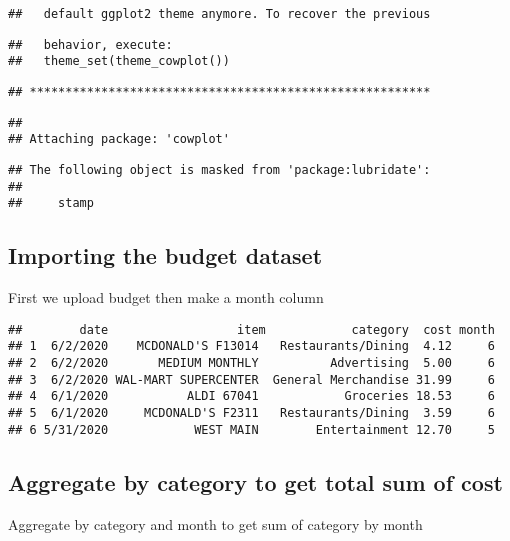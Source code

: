 \documentclass[
]{article}
\newenvironment{Shaded}{\begin{snugshade}}{\end{snugshade}}
\newcommand{\DataTypeTok}[1]{\textcolor[rgb]{0.13,0.29,0.53}{#1}}
\newcommand{\DecValTok}[1]{\textcolor[rgb]{0.00,0.00,0.81}{#1}}
\newcommand{\KeywordTok}[1]{\textcolor[rgb]{0.13,0.29,0.53}{\textbf{#1}}}
\newcommand{\NormalTok}[1]{#1}
\newcommand{\OperatorTok}[1]{\textcolor[rgb]{0.81,0.36,0.00}{\textbf{#1}}}
\newcommand{\StringTok}[1]{\textcolor[rgb]{0.31,0.60,0.02}{#1}}
\begin{document}
\begin{verbatim}
##   default ggplot2 theme anymore. To recover the previous
\end{verbatim}

\begin{verbatim}
##   behavior, execute:
##   theme_set(theme_cowplot())
\end{verbatim}

\begin{verbatim}
## ********************************************************
\end{verbatim}

\begin{verbatim}
## 
## Attaching package: 'cowplot'
\end{verbatim}

\begin{verbatim}
## The following object is masked from 'package:lubridate':
## 
##     stamp
\end{verbatim}

\hypertarget{importing-the-budget-dataset}{%
\subsection{Importing the budget
dataset}\label{importing-the-budget-dataset}}

First we upload budget then make a month column

\begin{verbatim}
##        date                  item            category  cost month
## 1  6/2/2020    MCDONALD'S F13014   Restaurants/Dining  4.12     6
## 2  6/2/2020       MEDIUM MONTHLY          Advertising  5.00     6
## 3  6/2/2020 WAL-MART SUPERCENTER  General Merchandise 31.99     6
## 4  6/1/2020           ALDI 67041            Groceries 18.53     6
## 5  6/1/2020     MCDONALD'S F2311   Restaurants/Dining  3.59     6
## 6 5/31/2020            WEST MAIN        Entertainment 12.70     5
\end{verbatim}

\hypertarget{aggregate-by-category-to-get-total-sum-of-cost}{%
\subsection{Aggregate by category to get total sum of
cost}\label{aggregate-by-category-to-get-total-sum-of-cost}}

Aggregate by category and month to get sum of category by month

\begin{Shaded}
\end{Shaded}
\end{document}
